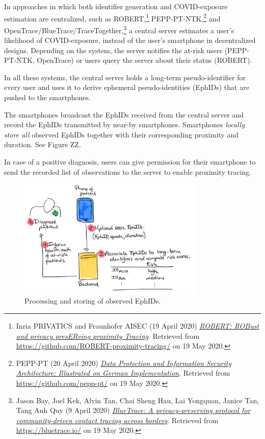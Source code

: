 \documentclass{article}
\begin{document}
In approaches in which both identifier generation and COVID-exposure
estimation are centralized, such as ROBERT,\footnote{Inria PRIVATICS and
  Fraunhofer AISEC (19 April 2020)
  \href{https://github.com/ROBERT-proximity-tracing/documents/blob/master/ROBERT-specification-EN-v1_0.pdf}{\emph{{ROBERT:
  ROBust and privacy presERving proximity Tracing}}}. Retrieved from
  \href{https://github.com/ROBERT-proximity-tracing/}{{https://github.com/ROBERT-proximity-tracing/}}
  on 19 May 2020.} PEPP-PT-NTK,\footnote{PEPP-PT (20 April 2020)
  \href{https://github.com/pepp-pt/pepp-pt-documentation/blob/master/10-data-protection/PEPP-PT-data-protection-information-security-architecture-Germany.pdf}{\emph{{Data
  Protection and Information Security Architecture: Illustrated on
  German Implementation}}}. Retrieved from
  \href{https://github.com/pepp-pt/}{{https://github.com/pepp-pt/}} on
  19 May 2020.} and OpenTrace/BlueTrace/TraceTogether,\footnote{Jason
  Bay, Joel Kek, Alvin Tan, Chai Sheng Hau, Lai Yongquan, Janice Tan,
  Tang Anh Quy (9 April 2020)
  \href{https://bluetrace.io/static/bluetrace_whitepaper-938063656596c104632def383eb33b3c.pdf}{\emph{{BlueTrace:
  A privacy-preserving protocol for community-driven contact tracing
  across borders}}}. Retrieved from
  \href{https://bluetrace.io/}{{https://bluetrace.io/}} on 19 May 2020.}
a central server estimates a user's likelihood of COVID-exposure,
instead of the user's smartphone in decentralized designs. Depending on
the system, the server notifies the at-risk users (PEPP-PT-NTK,
OpenTrace) or users query the server about their status (ROBERT).

In all these systems, the central server holds a long-term
pseudo-identifier for every user and uses it to derive ephemeral
pseudo-identities (EphIDs) that are pushed to the smartphones.

The smartphones broadcast the EphIDs received from the central server
and record the EphIDs transmitted by near-by smartphones. Smartphones
\emph{locally store all} observed EphIDs together with their
corresponding proximity and duration. See Figure ZZ.

In case of a positive diagnosis, users can give permission for their
smartphone to send the recorded list of observations to the server to
enable proximity tracing.

\begin{figure}\centering
\includegraphics[width=0.8\textwidth]{figs/PT-central.png}
\caption{Processing and storing of observed EphIDs.}
\end{figure}
\end{document}
